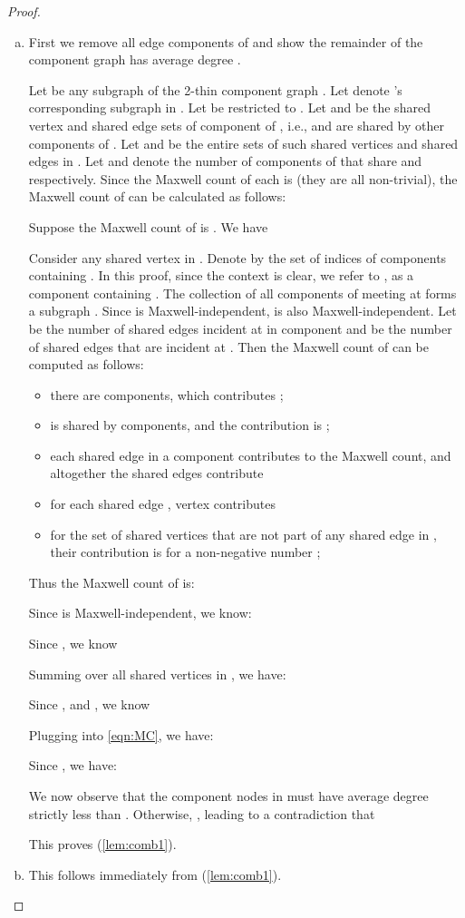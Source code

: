 \documentclass[10pt]{article}
\begin{document}
\begin{proof}
\begin{enumerate}[(a)]
\item\label{lem:comb1} First we remove all edge components of  and show the remainder of the component graph has average degree .

Let  be any subgraph of the 2-thin component graph . Let  denote 's corresponding subgraph in .
Let  be  restricted to . Let  and  be the shared vertex and shared edge sets of component  of , i.e.,  and  are shared by other components  of . Let  and  be the entire sets of such shared vertices and shared edges in . Let  and  denote the number of components  of  that share  and  respectively. Since the Maxwell count of each  is  (they are all non-trivial), the Maxwell count of  can be calculated as follows:


Suppose the Maxwell count of  is . We have



Consider any shared vertex  in . Denote by  the set of indices of components containing . In this proof, since the context is clear, we refer to ,  as a component containing . The collection of all  components of  meeting at  forms a subgraph . Since  is Maxwell-independent,  is also Maxwell-independent. Let  be the number of shared edges incident at  in component  and  be the number of shared edges that are incident at . Then the Maxwell count of  can be computed as follows:
\begin{itemize}
\item there are  components, which contributes ;
\item  is shared by  components, and the contribution is ;
\item each shared edge in a component  contributes  to the Maxwell count, and altogether the shared edges contribute 
\item for each shared edge , vertex  contributes 
\item for the set of shared vertices that are not part of any shared edge in , their contribution is  for a non-negative number ;
\end{itemize}
Thus the Maxwell count of  is:

Since  is Maxwell-independent, we know:

Since  , we know

Summing over all shared vertices in , we have:

Since ,  and , we know

Plugging into \eqref{eqn:MC}, we have:

Since , we have:

We now observe that the component nodes in  must have average degree strictly less than . Otherwise, , leading to a contradiction that

This proves (\ref{lem:comb1}).

\item This follows immediately from (\ref{lem:comb1}).

\end{enumerate}


\end{proof}
\end{document}
